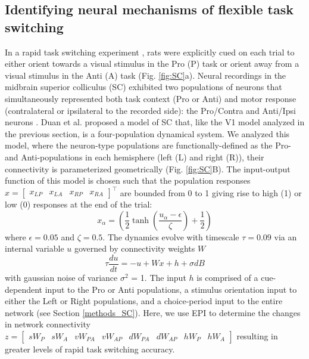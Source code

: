 \documentclass[11pt]{article}
\begin{document}
\subsection{Identifying neural mechanisms of flexible task switching} \label{results_SC}
In a rapid task switching experiment \cite{duan2015requirement}, rats were explicitly cued on each trial to either orient towards a visual stimulus in the Pro (P) task or orient away from a visual stimulus in the Anti (A) task (Fig. \ref{fig:SC}a). Neural recordings in the midbrain superior colliculus (SC) exhibited two populations of neurons that simultaneously represented both task context (Pro or Anti) and motor response (contralateral or ipsilateral to the recorded side): the Pro/Contra and Anti/Ipsi neurons \cite{duan2018collicular}.
Duan et al. proposed a model of SC that, like the V1 model analyzed in the previous section, is a four-population dynamical system.  
We analyzed this model, where the neuron-type populations are functionally-defined as the Pro- and Anti-populations in each hemisphere (left (L) and right (R)), their connectivity is parameterized geometrically  (Fig. \ref{fig:SC}B).
The input-output function of this model is chosen such that the population responses $x = \begin{bmatrix} x_{LP} & x_{LA} & x_{RP} & x_{RA} \end{bmatrix}^\top$ are bounded from 0 to 1 giving rise to high (1) or low (0) responses at the end of the trial:
\begin{equation}
x_\alpha =\left(\frac{1}{2}\tanh\left(\frac{u_\alpha - \epsilon}{\zeta}\right)+ \frac{1}{2} \right)
\end{equation}
where $\epsilon = 0.05$ and $\zeta = 0.5$.  The dynamics evolve with timescale $\tau=0.09$ via an internal variable $u$ governed by connectivity weights $W$
\begin{equation}
\tau \frac{du}{dt} = -u + Wx + h + \sigma dB
\end{equation}
with gaussian noise of variance $\sigma^2$ = 1.
The input $h$ is comprised of a cue-dependent input to the Pro or Anti populations, a stimulus orientation input to either the Left or Right populations, and a choice-period input to the entire network (see Section \ref{methods_SC}).
Here, we use EPI to determine the changes in network connectivity $z = \begin{bmatrix} sW_P & sW_A & vW_{PA} & vW_{AP} & dW_{PA} & dW_{AP} & hW_P & hW_A \end{bmatrix}$ resulting in greater levels of rapid task switching accuracy.
\end{document}
